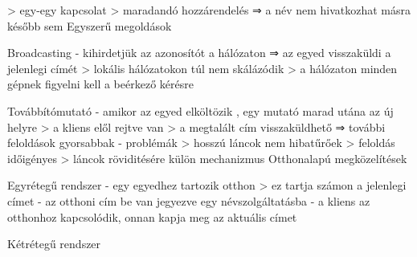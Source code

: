 \documentclass[twoside, a4paper, 12pt]{article}
\begin{document}
\begin{description}
                                                                        > egy-egy kapcsolat
                                                                        > maradandó hozzárendelés
                                                                        ⇒ a név nem hivatkozhat másra később sem
                                                                        Egyszerű megoldások 
                                                                    \item Broadcasting
                                                                        - kihirdetjük az azonosítót a hálózaton ⇒ az egyed visszaküldi a jelenlegi címét
                                                                        > lokális hálózatokon túl nem skálázódik
                                                                        > a hálózaton minden gépnek figyelni kell a beérkező kérésre 
                                                                    \item Továbbítómutató
                                                                        - amikor az egyed elköltözik , egy mutató marad utána az új helyre
                                                                        > a kliens elől rejtve van
                                                                        > a megtalált cím visszaküldhető ⇒ további feloldások gyorsabbak
                                                                        - problémák
                                                                        > hosszú láncok nem hibatűrőek
                                                                        > feloldás időigényes
                                                                        > láncok röviditésére külön mechanizmus
                                                                        Otthonalapú megközelítések
                                                                    \item Egyrétegű rendszer
                                                                        - egy egyedhez tartozik otthon
                                                                        > ez tartja számon a jelenlegi címet
                                                                        - az otthoni cím be van jegyezve egy névszolgáltatásba
                                                                        - a kliens az otthonhoz kapcsolódik, onnan kapja meg az aktuális címet
                                                                    \item Kétrétegű rendszer

\end{description}
\end{document}
